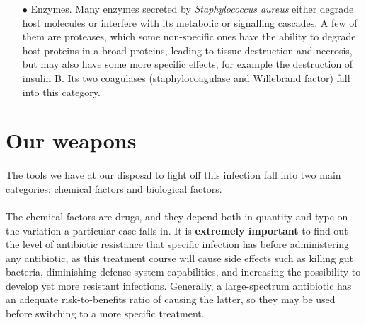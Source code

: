 \begin{itemize}
\item[$\bullet$] Enzymes. Many enzymes secreted by \emph{Staphylococcus aureus} either degrade host molecules or interfere with its metabolic or signalling cascades. A few of them are proteases, which some non-specific ones have the ability to degrade host proteins in a broad proteins, leading to tissue destruction and necrosis, but may also have some more specific effects, for example the destruction of insulin B. Its two coagulases (staphylocoagulase and Willebrand factor) fall into this category.
\end{itemize}
\section{Our weapons}
\paragraph{} The tools we have at our disposal to fight off this infection fall into two main categories: chemical factors and biological factors.
\paragraph{} The chemical factors are drugs, and they depend both in quantity and type on the variation a particular case falls in. It is \textbf{extremely important} to find out the level of antibiotic resistance that specific infection has before administering any antibiotic, as this treatment course will cause side effects such as killing gut bacteria, diminishing defense system capabilities, and increasing the possibility to develop yet more resistant infections. Generally, a large-spectrum antibiotic has an adequate risk-to-benefits ratio of causing the latter, so they may be used before switching to a more specific treatment.
